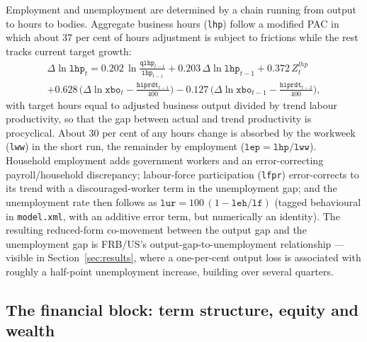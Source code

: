 Employment and unemployment are determined by a chain running from output to hours to bodies. Aggregate business hours (\texttt{lhp}) follow a modified PAC in which about 37 per cent of hours adjustment is subject to frictions while the rest tracks current target growth:
\begin{multline}
\Delta\ln \texttt{lhp}_t = 0.202\,\ln\tfrac{\texttt{qlhp}_{t-1}}{\texttt{lhp}_{t-1}} + 0.203\,\Delta\ln \texttt{lhp}_{t-1} + 0.372\,Z^{lhp}_t \\
 + 0.628\,\big(\Delta\ln \texttt{xbo}_t - \tfrac{\texttt{hlprdt}_{t-1}}{400}\big) - 0.127\,\big(\Delta\ln \texttt{xbo}_{t-1} - \tfrac{\texttt{hlprdt}_{t-2}}{400}\big),
\label{eq:lhp}
\end{multline}
with target hours equal to adjusted business output divided by trend labour productivity, so that the gap between actual and trend productivity is procyclical. About 30 per cent of any hours change is absorbed by the workweek (\texttt{lww}) in the short run, the remainder by employment ($\texttt{lep}=\texttt{lhp}/\texttt{lww}$). Household employment adds government workers and an error-correcting payroll/household discrepancy; labour-force participation (\texttt{lfpr}) error-corrects to its trend with a discouraged-worker term in the unemployment gap; and the unemployment rate then follows as $\texttt{lur}=100\,(1-\texttt{leh}/\texttt{lf})$ (tagged behavioural in \texttt{model.xml}, with an additive error term, but numerically an identity). The resulting reduced-form co-movement between the output gap and the unemployment gap is FRB/US's output-gap-to-unemployment relationship --- visible in Section~\ref{sec:results}, where a one-per-cent output loss is associated with roughly a half-point unemployment increase, building over several quarters.

\subsection{The financial block: term structure, equity and wealth}
\label{sec:finblock}

